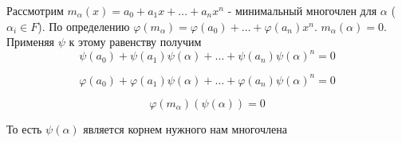 \par \Proof Рассмотрим $m_{\alpha}(x) = a_0+a_1x+\ldots+a_nx^n$ - минимальный многочлен для $\alpha$ ($\alpha_i \in F$). По определению $\varphi(m_\alpha)=\varphi(a_0)+\ldots+\varphi(a_n)x^n$. $m_{\alpha}(\alpha)=0$. Применяя $\psi$ к этому равенству получим 
$$\psi(a_0)+\psi(a_1)\psi(\alpha)+\ldots+\psi(a_n)\psi(\alpha)^n=0$$

$$\varphi(a_0)+\varphi(a_1)\psi(\alpha)+\ldots+\varphi(a_n)\psi(\alpha)^n=0$$

$$\varphi(m_{\alpha})(\psi(\alpha))=0$$

\par То есть $\psi(\alpha)$ является корнем нужного нам многочлена \EndProof